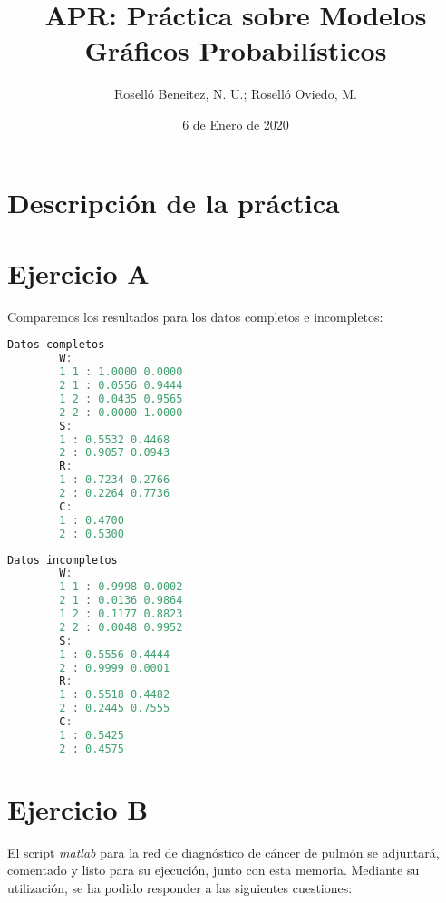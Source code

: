 \documentclass[a4paper]{article}
\begin{document}
\author{Roselló Beneitez, N. U.; Roselló Oviedo, M.}
\title{APR: Práctica sobre Modelos Gráficos Probabilísticos}
\date{6 de Enero de 2020}
\maketitle{}
\thispagestyle{empty}

\newpage
\tableofcontents
\listoffigures

\newpage
\section{Descripción de la práctica}
\quad 

\section{Ejercicio A}
\quad Comparemos los resultados para los datos completos e incompletos:

    \begin{table*}[h!]
      \noindent \begin{minipage}{.45\columnwidth}
        \begin{lstlisting}[language=octave]
		Datos completos
		W:
		1 1 : 1.0000 0.0000 
		2 1 : 0.0556 0.9444 
		1 2 : 0.0435 0.9565 
		2 2 : 0.0000 1.0000 
		S:
		1 : 0.5532 0.4468 
		2 : 0.9057 0.0943 
		R:
		1 : 0.7234 0.2766 
		2 : 0.2264 0.7736 
		C:
		1 : 0.4700 
		2 : 0.5300 
		\end{lstlisting}
      \end{minipage}\hfill
      \begin{minipage}{.6\columnwidth}
      	\begin{lstlisting}[language=octave, xleftmargin=1cm, xrightmargin=1cm]
		Datos incompletos
		W:
		1 1 : 0.9998 0.0002 
		2 1 : 0.0136 0.9864 
		1 2 : 0.1177 0.8823 
		2 2 : 0.0048 0.9952 
		S:
		1 : 0.5556 0.4444 
		2 : 0.9999 0.0001 
		R:
		1 : 0.5518 0.4482 
		2 : 0.2445 0.7555 
		C:
		1 : 0.5425 
		2 : 0.4575 
		\end{lstlisting}
      \end{minipage}
    \end{table*}

\section{Ejercicio B}
\quad El script \textit{matlab} para la red de diagnóstico de cáncer de pulmón se adjuntará, comentado y listo para su ejecución, junto con esta memoria. Mediante su utilización, se ha podido responder a las siguientes cuestiones:
\end{document}
